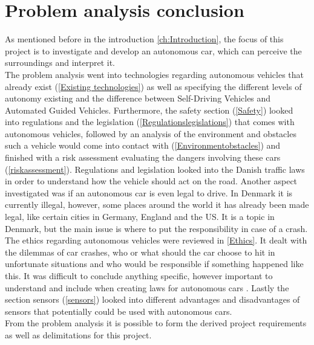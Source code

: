\chapter{Problem analysis conclusion}
As mentioned before in the introduction \ref{ch:Introduction}, the focus of this project is to investigate and develop an autonomous car, which can perceive the surroundings and interpret it.\\
The problem analysis went into technologies regarding autonomous vehicles that already exist (\ref{Existing technologies}) as well as specifying the  different levels of autonomy existing and the difference between Self-Driving Vehicles and Automated Guided Vehicles. Furthermore, the safety section (\ref{Safety}) looked into regulations and the legislation (\ref{Regulationslegislations}) that comes with autonomous vehicles, followed by an analysis of the environment and obstacles such a vehicle would come into contact with (\ref{Environmentobstacles}) and finished with a risk assessment evaluating the dangers involving these cars (\ref{riskassessment}). Regulations and legislation looked into the Danish traffic laws in order to understand how the vehicle should act on the road. Another aspect investigated was if an autonomous car is even legal to drive. In Denmark it is currently illegal, however, some places around the world it has already been made legal, like certain cities in Germany, England and the US. It is a topic in Denmark, but the main issue is where to put the responsibility in case of a crash. The ethics regarding autonomous vehicles were reviewed in \ref{Ethics}. It dealt with the dilemmas of car crashes, who or what should the car choose to hit in unfortunate situations and who would be responsible if something happened like this. It was difficult to conclude anything specific, however important to understand and include when creating laws for autonomous cars . Lastly the section sensors (\ref{sensors}) looked into different advantages and disadvantages of sensors that potentially could be used with autonomous cars. \\
From the problem analysis it is possible to form the derived project requirements as well as delimitations for this project.    


